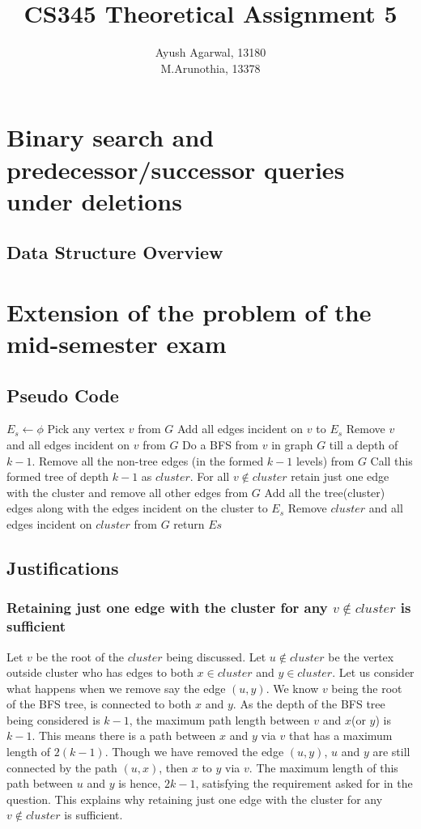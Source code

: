 \documentclass{article}
\title{CS345 Theoretical Assignment 5 \\ }
\author{\vspace{2mm} \large Ayush Agarwal, 13180 \\ M.Arunothia, 13378}
\date{}
\begin{document}
\maketitle
\tableofcontents
\newpage
\section{Binary search and predecessor/successor queries under deletions}
\subsection{Data Structure Overview}

\newpage    
\section{Extension of the problem of the mid-semester exam}
\subsection{Pseudo Code}
\begin{algorithmic}[1]
  \State $E_s \gets \phi$
  \State Pick any vertex $v$ from $G$ 
  \State Add all edges incident on $v$ to $E_s$
  \State Remove $v$ and all edges incident on $v$ from $G$
  \Else
  \State Do a BFS from $v$ in graph $G$ till a depth of $k-1$.  
  \State Remove all the non-tree edges (in the formed $k-1$ levels) from $G$
  \State Call this formed tree of depth $k-1$ as $cluster$. 
  \State For all $v \not\in cluster$ retain just one edge with the cluster and remove all other edges from $G$
  \State Add all the tree(cluster) edges along with the edges incident on the cluster to $E_s$
  \State Remove $cluster$ and all edges incident on $cluster$ from $G$
  \EndIf
  \EndWhile
  \State return $Es$
  \EndProcedure
\end{algorithmic} 
\subsection{Justifications}
\subsubsection{Retaining just one edge with the cluster for any $v \not\in cluster$ is sufficient}
Let $v$ be the root of the $cluster$ being discussed. Let $u \not \in cluster$ be the vertex outside cluster who has edges to both $x \in cluster $ and $y \in cluster$. Let us consider what happens when we remove say the edge $(u,y)$. We know $v$ being the root of the BFS tree, is connected to both $x$ and $y$. As the depth of the BFS tree being considered is $k-1$, the maximum path length between $v$ and $x$(or $y$) is $k-1$. This means there is a path between $x$ and $y$ via $v$ that has a maximum length of $2(k-1)$. Though we have removed the edge $(u,y)$, $u$ and $y$ are still connected by the path $(u,x)$, then $x$ to $y$ via $v$. The maximum length of this path between $u$ and $y$ is hence, $2k-1$, satisfying the requirement asked for in the question. This explains why retaining just one edge with the cluster for any $v \not\in cluster$ is sufficient.
\end{document}
